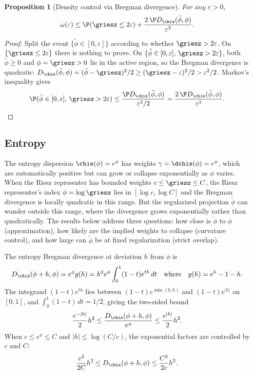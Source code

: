\documentclass{article}
\newtheorem{proposition}[theorem]{Proposition}
\begin{document}
\begin{proposition}[Density control via Bregman divergence]\label{prop:anticonc-sobolev}
For any $\varepsilon > 0$,
\begin{equation}\label{eq:density-control-bound}
\omega(\varepsilon)
  \le \P(\griesz \le 2\varepsilon)
  + \frac{2\,\P D_{\chis}(\tilde\phi, \phi)}{\varepsilon^2}.
\end{equation}
\end{proposition}

\begin{proof}
Split the event $\{\tilde\phi \in [0,\varepsilon]\}$
according to whether $\griesz > 2\varepsilon$.
On $\{\griesz \le 2\varepsilon\}$
there is nothing to prove.
On $\{\tilde\phi \in [0,\varepsilon],\, \griesz > 2\varepsilon\}$,
both $\tilde\phi \ge 0$ and $\phi = \griesz > 0$
lie in the active region,
so the Bregman divergence is quadratic:
$D_{\chis}(\tilde\phi, \phi)
  = (\tilde\phi - \griesz)^2/2
  \ge (\griesz - \varepsilon)^2/2
  > \varepsilon^2/2$.
Markov's inequality gives
\[
\P(\tilde\phi \in [0,\varepsilon],\, \griesz > 2\varepsilon)
  \le \frac{\P D_{\chis}(\tilde\phi, \phi)}{\varepsilon^2/2}
  = \frac{2\,\P D_{\chis}(\tilde\phi, \phi)}{\varepsilon^2}.
\qedhere
\]
\end{proof}


\subsection{Entropy}

The entropy dispersion $\chis(\phi) = e^\phi$ has weights $\gamma = \dchis(\phi) = e^\phi$, which are automatically positive but can grow or collapse exponentially as $\phi$ varies. When the Riesz representer has bounded weights $c \le \griesz \le C$, the Riesz representer's index $\phi = \log \griesz$ lies in $[\log c, \log C]$ and the Bregman divergence is locally quadratic in this range. But the regularized projection $\tilde\phi$ can wander outside this range, where the divergence grows exponentially rather than quadratically. The results below address three questions: how close is $\tilde\phi$ to $\phi$ (approximation), how likely are the implied weights to collapse (curvature control), and how large can $\tilde\phi$ be at fixed regularization (strict overlap).

The entropy Bregman divergence at deviation $h$ from $\phi$ is
\[
D_{\chis}(\phi + h, \phi) = e^\phi g(h) = h^2 e^\phi \int_0^1 (1-t) e^{th}\,dt \qqtext{where} g(h) = e^h - 1 - h.
\]
The integrand $(1-t)e^{th}$ lies between $(1-t)e^{\min(0,h)}$ and $(1-t)e^{|h|}$ on $[0,1]$, and $\int_0^1 (1-t)\,dt = 1/2$, giving the two-sided bound
\[
\frac{e^{-|h|}}{2} h^2 \le \frac{D_{\chis}(\phi + h, \phi)}{e^\phi} \le \frac{e^{|h|}}{2} h^2.
\]
When $c \le e^\phi \le C$ and $|h| \le \log(C/c)$, the exponential factors are controlled by $c$ and $C$:
\begin{equation}\label{eq:bregman-sandwich-app}
\frac{c^2}{2C}h^2 \le D_{\chis}(\phi + h, \phi) \le \frac{C^2}{2c}h^2.
\end{equation}
\end{document}

